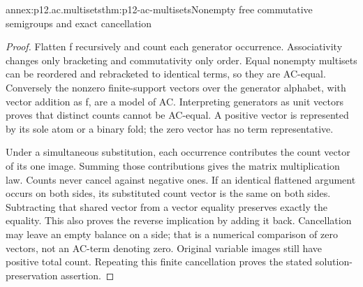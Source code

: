 \begin{annexitem}{annex:p12.ac.multisets}{thm:p12-ac-multisets}{Nonempty free commutative semigroups and exact cancellation}
\begin{proof}
Flatten f recursively and count each generator occurrence. Associativity
changes only bracketing and commutativity only order. Equal nonempty
multisets can be reordered and rebracketed to identical terms, so
they are AC-equal. Conversely the nonzero finite-support vectors over
the generator alphabet, with vector addition as f, are a model of AC.
Interpreting generators as unit vectors proves that distinct counts
cannot be AC-equal. A positive vector is represented by its sole
atom or a binary fold; the zero vector has no term representative.

Under a simultaneous substitution, each occurrence contributes the
count vector of its one image. Summing those contributions gives the
matrix multiplication law. Counts never cancel against negative ones.
If an identical flattened argument occurs on both sides, its substituted
count vector is the same on both sides. Subtracting that shared vector
from a vector equality preserves exactly the equality. This also proves
the reverse implication by adding it back. Cancellation may leave an
empty balance on a side; that is a numerical comparison of zero
vectors, not an AC-term denoting zero. Original variable images still
have positive total count. Repeating this finite cancellation proves
the stated solution-preservation assertion.
\end{proof}
\end{annexitem}

